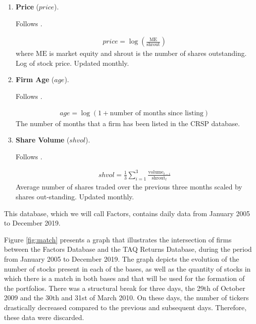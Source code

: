 \begin{enumerate}
	
	
	\item \textbf{Price} ($price$). 
	
	Follows . 
	
	\begin{align*}
		price = \log\left( \frac{ \mathrm{ME} }{ \mathrm{shrout} } \right)
	\end{align*}
	where $\mathrm{ME}$ is market equity and $\mathrm{shrout}$ is the number of shares outstanding. Log of stock price. Updated monthly.
	
	
	
	\item \textbf{Firm Age} ($age$). 
	
	Follows . 
	
	\begin{align*}
		age = \log(1 + \text{number of months since listing})
	\end{align*}
	The number of months that a firm has been listed in the CRSP database.
	
	
	
	\item \textbf{Share Volume} ($shvol$). 
	
	Follows . 
	
	\begin{align*}
		shvol = \frac{1}{3} \sum^3_{i=1} \frac{ \mathrm{volume}_{t-i} }{ \mathrm{shrout}_t }
	\end{align*}
	Average number of shares traded over the previous three months scaled by shares out-standing. Updated monthly.
	
	
	
		
\end{enumerate}


This database, which we will call Factors, contains daily data from January 2005 to December 2019.

Figure \ref{fig:match} presents a graph that illustrates the intersection of firms between the Factors Database and the TAQ Returns Database, during the period from January 2005 to December 2019. The graph depicts the evolution of the number of stocks present in each of the bases, as well as the quantity of stocks in which there is a match in both bases and that will be used for the formation of the portfolios. There was a structural break for three days, the 29th of October 2009 and the 30th and 31st of March 2010. On these days, the number of tickers drastically decreased compared to the previous and subsequent days. Therefore, these data were discarded.

